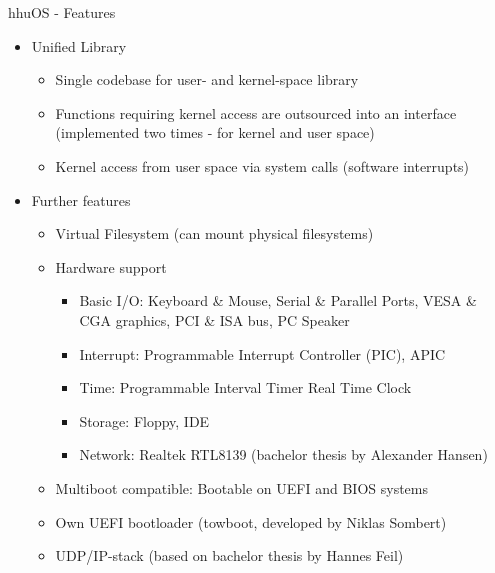 	\begin{frame}{hhuOS - Features}
		\begin{itemize}
			\item Unified Library
			\begin{itemize}
				\item Single codebase for user- and kernel-space library
				\item Functions requiring kernel access are outsourced into an interface (implemented two times - for kernel and user space)
				\item Kernel access from user space via system calls (software interrupts)
			\end{itemize}
			\pause
			\item Further features
			\begin{itemize}
				\item Virtual Filesystem (can mount physical filesystems)
				\item Hardware support
					\begin{itemize}
						\item Basic I/O: Keyboard \& Mouse, Serial \& Parallel Ports, VESA \& CGA graphics, PCI \& ISA bus, PC Speaker
						\item Interrupt: Programmable Interrupt Controller (PIC), APIC
						\item Time: Programmable Interval Timer Real Time Clock
						\item Storage: Floppy, IDE
						\item Network: Realtek RTL8139 (bachelor thesis by Alexander Hansen)
					\end{itemize}
				\item Multiboot compatible: Bootable on UEFI and BIOS systems
				\item Own UEFI bootloader (towboot, developed by Niklas Sombert)
				\item UDP/IP-stack (based on bachelor thesis by Hannes Feil)
			\end{itemize}	
		\end{itemize}
	\end{frame}
